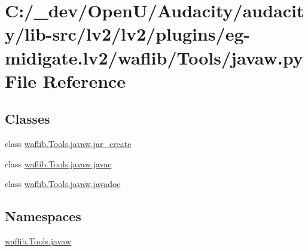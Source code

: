 \hypertarget{lv2_2plugins_2eg-midigate_8lv2_2waflib_2_tools_2javaw_8py}{}\section{C\+:/\+\_\+dev/\+Open\+U/\+Audacity/audacity/lib-\/src/lv2/lv2/plugins/eg-\/midigate.lv2/waflib/\+Tools/javaw.py File Reference}
\label{lv2_2plugins_2eg-midigate_8lv2_2waflib_2_tools_2javaw_8py}
\subsection*{Classes}
\begin{DoxyCompactItemize}
\item 
class \hyperlink{classwaflib_1_1_tools_1_1javaw_1_1jar__create}{waflib.\+Tools.\+javaw.\+jar\+\_\+create}
\item 
class \hyperlink{classwaflib_1_1_tools_1_1javaw_1_1javac}{waflib.\+Tools.\+javaw.\+javac}
\item 
class \hyperlink{classwaflib_1_1_tools_1_1javaw_1_1javadoc}{waflib.\+Tools.\+javaw.\+javadoc}
\end{DoxyCompactItemize}
\subsection*{Namespaces}
\begin{DoxyCompactItemize}
\item 
 \hyperlink{namespacewaflib_1_1_tools_1_1javaw}{waflib.\+Tools.\+javaw}
\end{DoxyCompactItemize}
